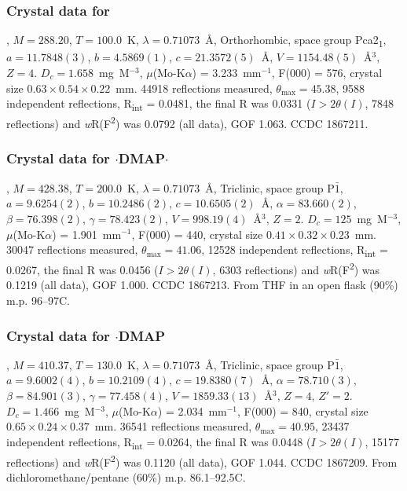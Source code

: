 \begin{refsection}
\subsubsection{Crystal data for }
, $M=288.20$, $T=100.0$~K, $\lambda=0.71073$~\AA, Orthorhombic, space group Pca2\textsubscript{1}, $a = 11.7848(3)$, $b = 4.5869(1)$, $c = 21.3572(5)$~\AA, $V = 1154.48(5)$~\AA$^{3}$, $Z = 4$.
$D_{c}= 1.658$~mg~M$^{-3}$, $\mu$(Mo-K$\alpha$) = 3.233~mm$^{-1}$, F(000) = 576, crystal size $0.63 \times 0.54 \times 0.22$~mm.
44918 reflections measured, $\theta_{\mathrm{max}}=45.38$\degree, 9588 independent reflections, R\textsubscript{int} = 0.0481, the final R was 0.0331 ($I > 2\theta(I)$, 7848 reflections) and \emph{w}R(F\textsuperscript{2}) was 0.0792 (all data), GOF 1.063. 
CCDC 1867211. 

\subsubsection{Crystal data for $\cdot$DMAP$\cdot$}
, $M=428.38$, $T=200.0$~K, $\lambda=0.71073$~\AA, Triclinic, space group P$\bar{1}$, $a = 9.6254(2)$, $b = 10.2486(2)$, $c = 10.6505(2)$~\AA, $\alpha = 83.660(2)$\degree, $\beta = 76.398(2)$\degree, $\gamma = 78.423(2)$\degree, $V = 998.19(4)$~\AA$^{3}$, $Z = 2$.
$D_{c}= 125$~mg~M$^{-3}$, $\mu$(Mo-K$\alpha$) = 1.901~mm$^{-1}$, F(000) = 440, crystal size $0.41 \times 0.32 \times 0.23$~mm.
30047 reflections measured, $\theta_{\mathrm{max}} = 41.06$\degree, 12528 independent reflections, R\textsubscript{int} = 0.0267, the final R was 0.0456 ($I > 2\theta(I)$, 6303 reflections) and \emph{w}R(F\textsuperscript{2}) was 0.1219 (all data), GOF 1.000. 
CCDC 1867213. 
From THF in an open flask (90\%) m.p. 96--97\degree C.

\subsubsection{Crystal data for $\cdot$DMAP}
, $M=410.37$, $T=130.0$~K, $\lambda=0.71073$~\AA, Triclinic, space group P$\bar{1}$, $a = 9.6002(4)$, $b = 10.2109(4)$, $c = 19.8380(7)$~\AA, $\alpha = 78.710(3)$\degree, $\beta = 84.901(3)$\degree, $\gamma = 77.458(4)$\degree, $V = 1859.33(13)$~\AA$^{3}$, $Z = 4$, $Z\prime = 2$.
$D_{c}= 1.466$~mg~M$^{-3}$, $\mu$(Mo-K$\alpha$) = 2.034~mm$^{-1}$, F(000) = 840, crystal size $0.65 \times 0.24 \times 0.37$~mm.
36541 reflections measured, $\theta_{\mathrm{max}} = 40.95$\degree, 23437 independent reflections, R\textsubscript{int} = 0.0264, the final R was 0.0448 ($I > 2\theta(I)$, 15177 reflections) and \emph{w}R(F\textsuperscript{2}) was 0.1120 (all data), GOF 1.044. 
CCDC 1867209. 
From dichloromethane/pentane (60\%) m.p. 86.1--92.5\degree C.


\end{refsection}
